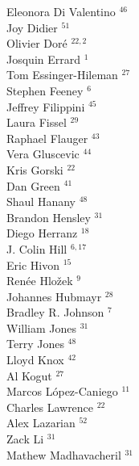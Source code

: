 \documentclass[PICOReport.tex]{subfiles}
\begin{document}
{\begin{multicols}{4}
Eleonora Di Valentino $^{46}$           \\
Joy Didier $^{51}$                      \\
Olivier Dor\'e $^{22,2}$                  \\
Josquin Errard $^{1}$                  \\
Tom Essinger-Hileman $^{27}$            \\
Stephen Feeney $^{6}$                  \\
Jeffrey Filippini $^{45}$               \\
Laura Fissel $^{29}$                    \\
Raphael Flauger $^{43}$                 \\
Vera Gluscevic $^{44}$                  \\
Kris Gorski $^{22}$                     \\
Dan Green $^{41}$                       \\
Shaul Hanany $^{48}$                    \\
Brandon Hensley $^{31}$                 \\
Diego Herranz $^{18}$                   \\
J. Colin Hill $^{6,17}$                   \\
Eric Hivon $^{15}$                      \\
Ren\'{e}e  Hlo\v{z}ek $^{9}$           \\
Johannes Hubmayr $^{28}$                \\
Bradley R. Johnson $^{7}$              \\
William Jones $^{31}$                   \\
Terry Jones $^{48}$                     \\
Lloyd Knox $^{42}$                      \\
Al Kogut $^{27}$                        \\
Marcos L\'{o}pez-Caniego $^{11}$        \\
Charles Lawrence $^{22}$                \\
Alex Lazarian $^{52}$                   \\
Zack Li $^{31}$                         \\
Mathew Madhavacheril $^{31}$            \\

\end{multicols}}
\end{document}
